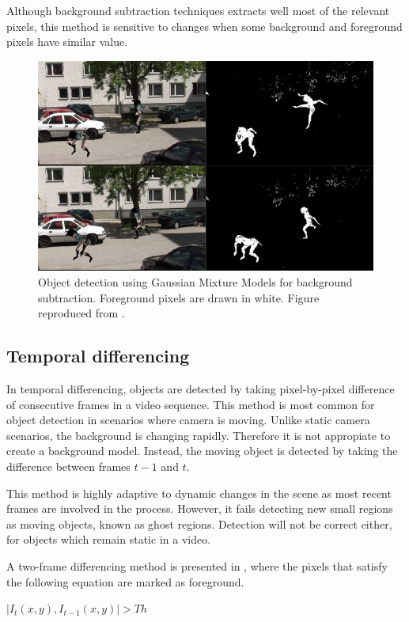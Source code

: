 Although background subtraction techniques extracts well most of the relevant
pixels, this method is sensitive to changes when some background and foreground
pixels have similar value.

\begin{figure}[h!]
	\centering
		\includegraphics[width=0.7\linewidth]{Figures/bg_sub.jpg}
	\caption[Object detection using Gaussian Mixture Models for background
	subtraction]
	{Object detection using Gaussian Mixture Models for background
	subtraction. Foreground pixels are drawn in white. Figure reproduced from
	\cite{Pham2010}.}
	\label{fig::bg_sub}
\end{figure}

\subsection{Temporal differencing}

In temporal differencing, objects are detected by taking pixel-by-pixel
difference of consecutive frames in a video sequence.
This method is most common for object detection in scenarios where camera
is moving. Unlike static camera scenarios, the background is changing rapidly.
Therefore it is not appropiate to create a background model. Instead,
the moving object is detected by taking the difference between frames $t - 1$
and $t$.

This method is highly adaptive to dynamic changes in the scene as most recent
frames are involved in the process. However, it fails detecting new small
regions as moving objects, known as ghost regions. Detection will not be correct either,
for objects which remain static in a video.

A two-frame differencing method is presented in \cite{Lipton1998a}, where the
pixels that satisfy the following equation are marked as foreground.\\
\centerline{$|I_t(x,y), I_{t-1}(x,y)|>Th$}

